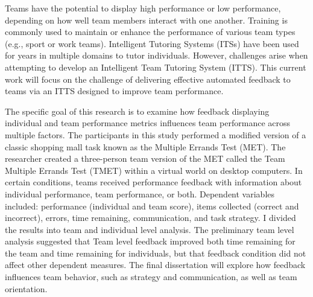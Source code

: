 
Teams have the potential to display high performance or low performance, depending on how well team members interact with one another. Training is commonly used to maintain or enhance the performance of various team types (e.g., sport or work teams). Intelligent Tutoring Systems (ITSs) have been used for years in multiple domains to tutor individuals. However, challenges arise when attempting to develop an Intelligent Team Tutoring System (ITTS). This current work will focus on the challenge of delivering effective automated feedback to teams via an ITTS designed to improve team performance.

The specific goal of this research is to examine how feedback displaying individual and team performance metrics influences team performance across multiple factors. The participants in this study performed a modified version of a classic shopping mall task known as the Multiple Errands Test (MET). The researcher created a three-person team version of the MET called the Team Multiple Errands Test (TMET) within a virtual world on desktop computers. In certain conditions, teams received performance feedback with information about individual performance, team performance, or both. Dependent variables included: performance (individual and team score), items collected (correct and incorrect), errors, time remaining, communication, and task strategy. I divided the results into team and individual level analysis. The preliminary team level analysis suggested that Team level feedback improved both time remaining for the team and time remaining for individuals, but that feedback condition did not affect other dependent measures.  The final dissertation will explore how feedback influences team behavior, such as strategy and communication, as well as team orientation.